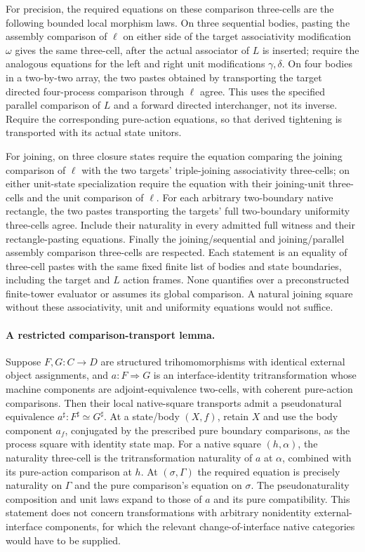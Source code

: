 \documentclass{article}
\begin{document}
For precision, the required equations on these comparison three-cells are the following bounded local morphism laws. On three sequential bodies, pasting the assembly comparison of $\ell$ on either side of the target associativity modification $\omega$ gives the same three-cell, after the actual associator of $L$ is inserted; require the analogous equations for the left and right unit modifications $\gamma,\delta$. On four bodies in a two-by-two array, the two pastes obtained by transporting the target directed four-process comparison through $\ell$ agree. This uses the specified parallel comparison of $L$ and a forward directed interchanger, not its inverse. Require the corresponding pure-action equations, so that derived tightening is transported with its actual state unitors.

For joining, on three closure states require the equation comparing the joining comparison of $\ell$ with the two targets' triple-joining associativity three-cells; on either unit-state specialization require the equation with their joining-unit three-cells and the unit comparison of $\ell$. For each arbitrary two-boundary native rectangle, the two pastes transporting the targets' full two-boundary uniformity three-cells agree. Include their naturality in every admitted full witness and their rectangle-pasting equations. Finally the joining/sequential and joining/parallel assembly comparison three-cells are respected. Each statement is an equality of three-cell pastes with the same fixed finite list of bodies and state boundaries, including the target and $L$ action frames. None quantifies over a preconstructed finite-tower evaluator or assumes its global comparison. A natural joining square without these associativity, unit and uniformity equations would not suffice.

\paragraph{A restricted comparison-transport lemma.} Suppose $F,G:C\to D$ are structured trihomomorphisms with identical external object assignments, and $a:F\Rightarrow G$ is an interface-identity tritransformation whose machine components are adjoint-equivalence two-cells, with coherent pure-action comparisons. Then their local native-square transports admit a pseudonatural equivalence $a^\sharp:F^\sharp\simeq G^\sharp$. At a state/body $(X,f)$, retain $X$ and use the body component $a_f$, conjugated by the prescribed pure boundary comparisons, as the process square with identity state map. For a native square $(h,\alpha)$, the naturality three-cell is the tritransformation naturality of $a$ at $\alpha$, combined with its pure-action comparison at $h$. At $(\sigma,\Gamma)$ the required equation is precisely naturality on $\Gamma$ and the pure comparison's equation on $\sigma$. The pseudonaturality composition and unit laws expand to those of $a$ and its pure compatibility. This statement does not concern transformations with arbitrary nonidentity external-interface components, for which the relevant change-of-interface native categories would have to be supplied.
\end{document}
